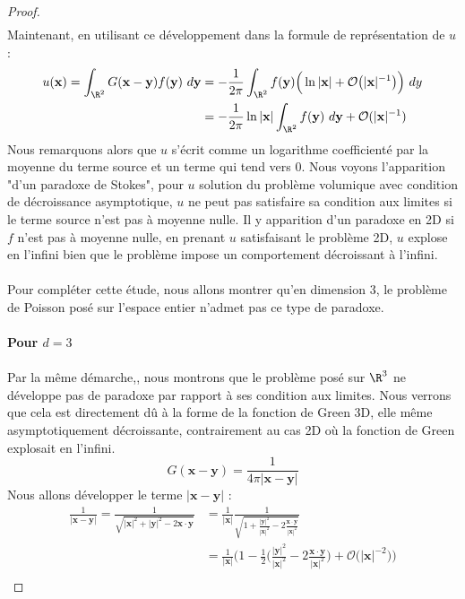 \begin{proof}
\begin{align*}
\end{align*}
Maintenant, en utilisant ce développement dans la formule de représentation de $u$ :
\begin{align*}
    u(\mathbf{x}) = \int_{\R^2} G(\mathbf{x - y}) f(\mathbf{y}) \ d\mathbf{y} &= -\frac{1}{2\pi} \int_{\R^2} f(\mathbf{y})\Big( \ln|\mathbf{x}| + \mathcal{O}\big( |\mathbf{x}|^{-1} \big) \Big) \ dy \\
    &= -\frac{1}{2\pi}\ln|\mathbf{x}|\int_{\R^2} f(\mathbf{y}) \ d\mathbf{y} + \mathcal{O}(|\mathbf{x}|^{-1})
\end{align*}
Nous remarquons alors que $u$ s'écrit comme un logarithme coefficienté par la moyenne du terme source et un terme qui tend vers 0. Nous voyons l'apparition "d'un paradoxe de Stokes", pour $u$ solution du problème volumique avec condition de décroissance asymptotique, $u$ ne peut pas satisfaire sa condition aux limites si le terme source n'est pas à moyenne nulle.
Il y apparition d'un paradoxe en 2D si $f$ n'est pas à moyenne nulle, en prenant $u$ satisfaisant le problème 2D, $u$ explose en l'infini bien que le problème impose un comportement décroissant à l'infini.\\
\\
Pour compléter cette étude, nous allons montrer qu'en dimension 3, le problème de Poisson posé sur l'espace entier n'admet pas ce type de paradoxe.\\
\\
\textbf{Pour $d=3$}\\
\\
Par la même démarche,, nous montrons que le problème posé sur $\R^3$ ne développe pas de paradoxe par rapport à ses condition aux limites.
Nous verrons que cela est directement dû à la forme de la fonction de Green 3D, elle même asymptotiquement décroissante, contrairement au cas 2D où la fonction de Green explosait en l'infini.
$$G(\mathbf{x - y}) = \frac{1}{4\pi|\mathbf{x - y}|}$$
Nous allons développer le terme $|\mathbf{x -y}|$ :
\begin{align*}
    \frac{1}{|\mathbf{x - y}|} = \frac{1}{\sqrt{|\mathbf{x}|^2 + |\mathbf{y}|^2 - 2 \mathbf{x} \cdot \mathbf{y}}} &= \frac{1}{|\mathbf{x}|} \frac{1}{\sqrt{1 + \frac{|\mathbf{y}|^2}{|\mathbf{x}|^2} - 2 \frac{\mathbf{x} \cdot \mathbf{y}}{|\mathbf{x}|^2}}} \\
    &= \frac{1}{|\mathbf{x}|} \bigg( 1 - \frac{1}{2}\Big( \frac{|\mathbf{y}|^2}{|\mathbf{x}|^2} - 2 \frac{\mathbf{x} \cdot \mathbf{y}}{|\mathbf{x}|^2} \Big) + \mathcal{O}\big( |\mathbf{x}|^{-2} \big) \bigg) \\

\end{align*}
\end{proof}
